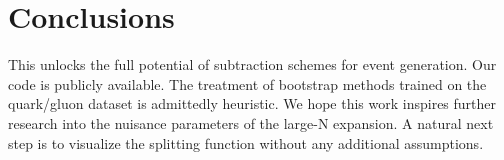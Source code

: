 \section{Conclusions}\label{sec:conclusions}

This unlocks the full potential of subtraction schemes for event
generation. Our code is publicly available. The treatment of bootstrap
methods trained on the quark/gluon dataset is admittedly heuristic. We
hope this work inspires further research into the nuisance parameters of
the large-N expansion. A natural next step is to visualize the splitting
function without any additional assumptions.

